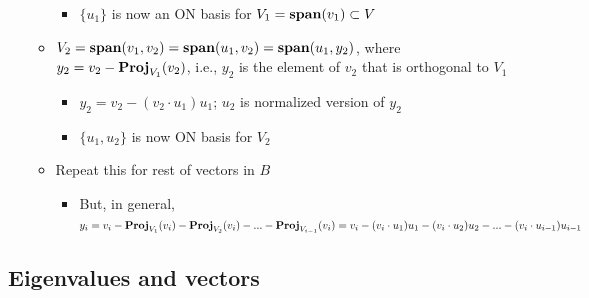 \documentclass[10pt,letterpaper]{article}
\begin{document}
\begin{enumerate}
\begin{itemize}
\begin{itemize}
\item $\{u_1\}$ is now an ON basis for $V_1 = {\bf span } (v_1) \subset V$
\end{itemize}

\item $V_2 = {\bf span } (v_1,v_2)= {\bf span} (u_1,v_2) = {\bf span} (u_1, y_2)$, where $y_2 = v_2 - {\bf Proj} _{V_1} (v_2)$, i.e., $y_2$ is the element of $v_2$ that is orthogonal to $V_1$

\begin{itemize}
\item $y_2 = v_2 - (v_2 \cdot u_1) u_1$; $u_2$ is normalized version of $y_2$
\item $\{u_1, u_2\}$ is now ON basis for $V_2$
\end{itemize}

\item Repeat this for rest of vectors in $B$

\begin{itemize}
\item But, in general, $y_i = v_i - {\bf Proj} _{V_{1}} (v_i) - {\bf Proj} _{V_{2}} (v_i)- ... - {\bf Proj} _{V_{i-1}} (v_i) = v_i - (v_i \cdot u_1) u_1 - (v_i \cdot u_2) u_2 - ... - (v_i \cdot u_{i-1}) u_{i-1}$
\end{itemize}

\end{itemize}

\end{enumerate}
\subsection{Eigenvalues and vectors}
\label{sec-1_11}
\end{document}

